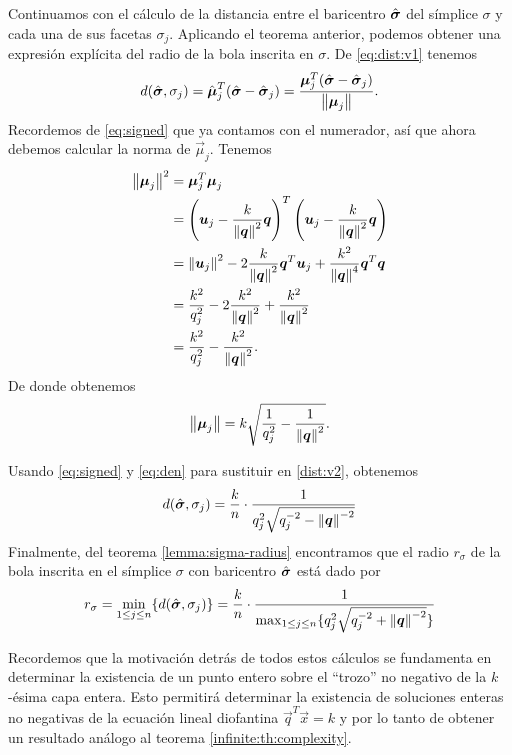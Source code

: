 Continuamos con el cálculo de la distancia entre el baricentro $\hat{\boldsymbol{ \sigma }}$ del símplice $\sigma$
y cada una de sus facetas $\sigma_j$. Aplicando el teorema anterior, podemos obtener una
expresión explícita del radio de la bola inscrita en $\sigma$. De \eqref{eq:dist:v1} tenemos
\begin{equation}
	\label{dist:v2}
	d(\hat{\boldsymbol{ \sigma }}, \sigma_j) = \hat{\boldsymbol{\mu}}_j^T(\hat{\boldsymbol{ \sigma }} - \hat{\boldsymbol{ \sigma }}_j)
	= \frac{\boldsymbol{\mu}_j^T(\hat{\boldsymbol{ \sigma }} - \hat{\boldsymbol{ \sigma }}_j)}{\left\lVert \boldsymbol{\mu}_j \right\rVert}.
\end{equation}
Recordemos de \eqref{eq:signed} que ya contamos con el numerador, así que ahora debemos calcular la
norma de $\vec{\mu}_j$. Tenemos
\begin{align*}
	\left\lVert \boldsymbol{\mu}_j \right\rVert^2
	&= \boldsymbol{\mu}_j^T\boldsymbol{\mu}_j \\
	&=
	\left(\boldsymbol{u}_j - \frac{k}{\left\lVert \boldsymbol{q} \right\rVert^2}\boldsymbol{q}\right)^T
	\left(\boldsymbol{u}_j - \frac{k}{\left\lVert \boldsymbol{q} \right\rVert^2}\boldsymbol{q}\right) \\
	&=
	\left\lVert \boldsymbol{u}_j \right\rVert^2 - 2\frac{k}{\left\lVert \boldsymbol{q} \right\rVert^2}\boldsymbol{q}^T\boldsymbol{u}_j +
	\frac{k^2}{\left\lVert \boldsymbol{q} \right\rVert^4}\boldsymbol{q}^T\boldsymbol{q} \\
	&= \frac{k^2}{q_j^2} - 2\frac{k^2}{\left\lVert \boldsymbol{q} \right\rVert^2} + \frac{k^2}{\left\lVert \boldsymbol{q} \right\rVert^2} \\
	&= \frac{k^2}{q_j^2} - \frac{k^2}{\left\lVert \boldsymbol{q} \right\rVert^2}.
\end{align*}
De donde obtenemos
\begin{equation}
	\label{eq:den}
	\left\lVert \boldsymbol{\mu}_j \right\rVert = k\sqrt{\frac{1}{q_j^2} - \frac{1}{\left\lVert \boldsymbol{q} \right\rVert^2}}.
\end{equation}

Usando \eqref{eq:signed} y \eqref{eq:den} para sustituir en \eqref{dist:v2}, obtenemos
\begin{equation*}
	d(\hat{\boldsymbol{ \sigma }}, \sigma_j) = \frac{k}{n} \cdot
	\frac{1}{q_j^2\sqrt{q_j^{-2} - \left\lVert \boldsymbol{q} \right\rVert^{-2}}}
\end{equation*}
Finalmente, del teorema \ref{lemma:sigma-radius} encontramos que el radio $r_\sigma$ de la bola
inscrita en el símplice $\sigma$ con baricentro $\hat{\boldsymbol{ \sigma }}$ está dado por
\begin{equation}
	\label{eq:sigma-radius}
	r_\sigma = \min_{1 \leq j \leq n} \lbrace d(\hat{\boldsymbol{ \sigma }}, \sigma_j) \rbrace = \frac{k}{n} \cdot
	\frac{1}{\max_{1 \leq j \leq n} \lbrace  q_j^2\sqrt{q_j^{-2} + \left\lVert \boldsymbol{q} \right\rVert^{-2}} \rbrace}
\end{equation}

Recordemos que la motivación detrás de todos estos cálculos se fundamenta en determinar la
existencia de un punto entero sobre el ``trozo'' no negativo de la $k$-ésima capa entera. Esto
permitirá determinar la existencia de soluciones enteras no negativas de la ecuación lineal
diofantina $\vec{q}^T\vec{x} = k$ y por lo tanto de obtener un resultado análogo al teorema
\ref{infinite:th:complexity}.

